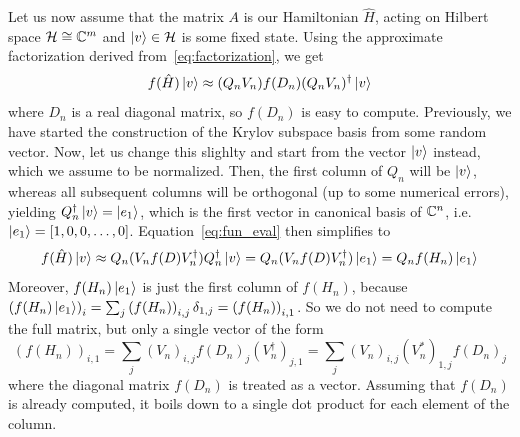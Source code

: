Let us now assume that the matrix \(A\) is our Hamiltonian \(\hat{H}\), acting on Hilbert space \(\mathcal{H}\cong \mathbb{C}^m\)
and \(\ket{v}\in \mathcal{H}\) is some fixed state.
Using the approximate factorization derived from~\eqref{eq:factorization}, we get
\begin{equation}
	f(\hat{H})\ket{v} \approx (Q_n V_n) f(D_n) (Q_n V_n)^{\dagger} \ket{v}
	\label{eq:fun_eval}
\end{equation}
where \(D_n\) is a real diagonal matrix, so \(f(D_n)\) is easy to compute.
Previously, we have started the construction of the Krylov subspace basis from some random vector. Now, let us
change this slighlty and start from the vector \(\ket{v}\) instead, which we assume to be normalized. Then,
the first column of \(Q_n\) will be \(\ket{v}\), whereas all subsequent columns will be orthogonal (up to some
numerical errors), yielding \(Q_n^{\dagger}\ket{v} = \ket{e_1}\), which is the first vector in canonical basis
of \( \mathbb{C}^n \), i.e. \( \ket{e_1} = \left[1,0,0,\ldots,0\right] \). Equation~\eqref{eq:fun_eval} then
simplifies to
\begin{equation}
	f(\hat{H}) \ket{v} \approx Q_n (V_n f(D) V_n^{\dagger}) Q_n^{\dagger} \ket{v} = Q_n (V_n f(D) V_n^{\dagger}) \ket{e_1}
	= Q_n f(H_n) \ket{e_1}
	\label{eq:lanczos_function}
\end{equation}
Moreover, \(f(H_n) \ket{e_1}\) is just the first column of \(f(H_n)\), because \( \left(f(H_n) \ket{e_1}\right)_i =
\sum_j \left(f(H_n)\right)_{i,j} \delta_{1,j} = \left(f(H_n)\right)_{i,1}\). So we do not need to compute the full
matrix, but only a single vector of the form
\begin{equation}
	\left(f(H_n)\right)_{i,1} = \sum_j \left(V_n\right)_{i,j} f(D_n)_j \left(V_n^{\dagger}\right)_{j,1}
	=  \sum_j \left(V_n\right)_{i,j} \left(V_n^{\ast}\right)_{1,j} f(D_n)_j
	\label{eq:c_vector}
\end{equation}
where the diagonal matrix \(f(D_n)\) is treated as a vector. Assuming that \(f(D_n)\) is already computed, it boils
down to a single dot product for each element of the column.

